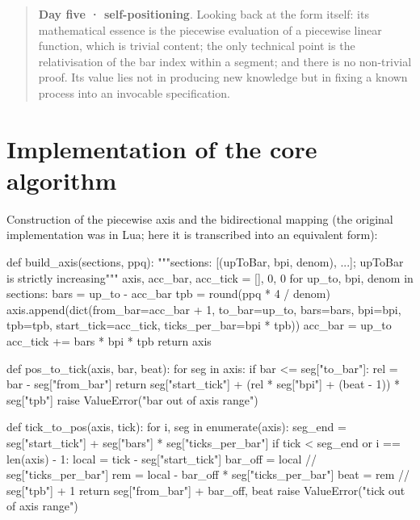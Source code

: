\documentclass[11pt,a4paper]{article}
\newenvironment{quotedpassage}{\begin{quote}\small}{\end{quote}}
\begin{document}
\begin{quotedpassage}
\textbf{Day five · self-positioning}. Looking back at the form itself: its mathematical
essence is the piecewise evaluation of a piecewise linear function, which is trivial
content; the only technical point is the relativisation of the bar index within a
segment; and there is no non-trivial proof. Its value lies not in producing new
knowledge but in fixing a known process into an invocable specification.
\end{quotedpassage}

\section{Implementation of the core algorithm}
Construction of the piecewise axis and the bidirectional mapping (the original
implementation was in Lua; here it is transcribed into an equivalent form):

\begin{museCode}[language=Python]
def build_axis(sections, ppq):
    """sections: [(upToBar, bpi, denom), ...]; upToBar is strictly increasing"""
    axis, acc_bar, acc_tick = [], 0, 0
    for up_to, bpi, denom in sections:
        bars = up_to - acc_bar
        tpb = round(ppq * 4 / denom)
        axis.append(dict(from_bar=acc_bar + 1, to_bar=up_to, bars=bars,
                         bpi=bpi, tpb=tpb, start_tick=acc_tick,
                         ticks_per_bar=bpi * tpb))
        acc_bar = up_to
        acc_tick += bars * bpi * tpb
    return axis

def pos_to_tick(axis, bar, beat):
    for seg in axis:
        if bar <= seg["to_bar"]:
            rel = bar - seg["from_bar"]
            return seg["start_tick"] + (rel * seg["bpi"] + (beat - 1)) * seg["tpb"]
    raise ValueError("bar out of axis range")

def tick_to_pos(axis, tick):
    for i, seg in enumerate(axis):
        seg_end = seg["start_tick"] + seg["bars"] * seg["ticks_per_bar"]
        if tick < seg_end or i == len(axis) - 1:
            local = tick - seg["start_tick"]
            bar_off = local // seg["ticks_per_bar"]
            rem = local - bar_off * seg["ticks_per_bar"]
            beat = rem // seg["tpb"] + 1
            return seg["from_bar"] + bar_off, beat
    raise ValueError("tick out of axis range")
\end{museCode}
\end{document}
